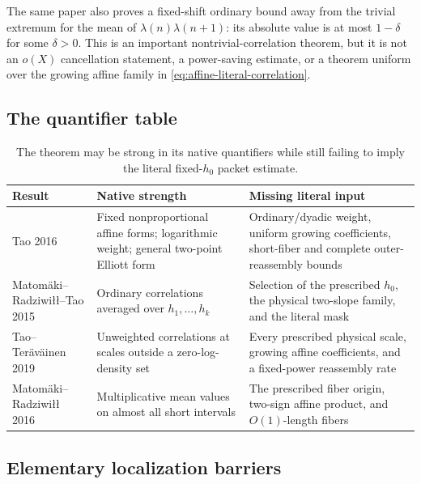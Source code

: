 The same paper also proves a fixed-shift ordinary bound away from the
trivial extremum for the mean of
\(\lambda(n)\lambda(n+1)\): its absolute value is at most
\(1-\delta\) for some \(\delta>0\).  This is an important
nontrivial-correlation theorem, but it is not an \(o(X)\) cancellation
statement, a power-saving estimate, or a theorem uniform over the
growing affine family in \eqref{eq:affine-literal-correlation}.

\clearpage
\subsection{The quantifier table}

\begin{table}[ht]
\centering
\small
\renewcommand{\arraystretch}{1.18}
\begin{tabularx}{\textwidth}{
  >{\raggedright\arraybackslash}p{}
  >{\raggedright\arraybackslash}p{}
  >{\raggedright\arraybackslash}X}
\toprule
Result & Native strength & Missing literal input\\
\midrule
Tao 2016
& Fixed nonproportional affine forms; logarithmic weight; general
two-point Elliott form
& Ordinary/dyadic weight, uniform growing coefficients, short-fiber
and complete outer-reassembly bounds\\
\addlinespace
Matom\"aki--Radziwi{\l}{\l}--Tao 2015
& Ordinary correlations averaged over \(h_1,\ldots,h_k\)
& Selection of the prescribed \(h_0\), the physical two-slope
family, and the literal mask\\
\addlinespace
Tao--Ter\"av\"ainen 2019
& Unweighted correlations at scales outside a zero-log-density set
& Every prescribed physical scale, growing affine coefficients, and
a fixed-power reassembly rate\\
\addlinespace
Matom\"aki--Radziwi{\l}{\l} 2016
& Multiplicative mean values on almost all short intervals
& The prescribed fiber origin, two-sign affine product, and
\(O(1)\)-length fibers\\
\bottomrule
\end{tabularx}
\caption{The theorem may be strong in its native quantifiers while
still failing to imply the literal fixed-\(h_0\) packet estimate.}
\label{tab:quantifier-audit}
\end{table}

\subsection{Elementary localization barriers}


